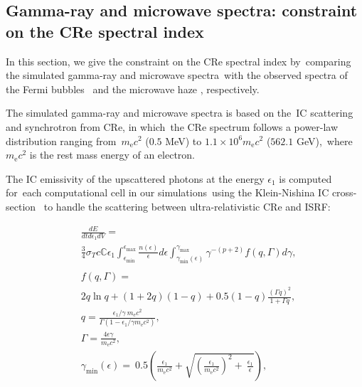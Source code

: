 \documentclass[twocolumn]{aastex631}
\begin{document}
\subsection{Gamma-ray and microwave spectra: constraint on the CRe spectral index}

In this section, we give the constraint on the CRe spectral index by\
comparing the simulated gamma-ray and microwave spectra\
with the observed spectra of the Fermi bubbles \citet{Ackermann2014}\
and the microwave haze \citep{Dobler_2008}, respectively.\

The simulated gamma-ray and microwave spectra is based on the\
IC scattering and synchrotron from CRe, in which\
the CRe spectrum follows a power-law distribution ranging from\
$m_{\text{e}}c^2$ ($0.5$ MeV) to $1.1\times10^{6}m_{\text{e}}c^2$ ($562.1$ GeV),\
where $m_{\text{e}}c^2$ is the rest mass energy of an electron.


The IC emissivity of the upscattered photons at the energy $\epsilon_{1}$ is computed for\
each computational cell in our simulations\
using the Klein-Nishina IC cross-section \citep{Jones1968,BLUMENTHAL1970}\
to handle the scattering between ultra-relativistic CRe and ISRF:

\begin{subequations}
  \begin{align}
  &\frac{dE}{dtd\epsilon_{1}dV} =\nonumber\\
               &\frac{3}{4}\sigma_{T}c\mathbb{C}\epsilon_{1}\int^{\epsilon_{\text{max}}}_{\epsilon_{\text{min}}}
               \frac{n(\epsilon)}{\epsilon}d\epsilon\int^{\gamma_{\text{max}}}_{\gamma_{\text{min}}\left(\epsilon\right)}
               \gamma^{-(p+2)}f(q, \Gamma)d\gamma,\\
  \nonumber\\
  &f(q, \Gamma) =\nonumber\\
               &2q\ln q+(1+2q)(1-q)+0.5(1-q)\frac{\left(\Gamma q\right)^2}{1+\Gamma q},\\
  &q=\frac{\epsilon_{1}/\gamma\
               m_{\text{e}}c^{2}}{\Gamma\left(1-\epsilon_{1}/\gamma m_{\text{e}}c^{2}\right)},\\
  &\Gamma=\frac{4\epsilon \gamma}{m_{\text{e}}c^2},\\
  &\gamma_{\text{min}}(\epsilon)=\
   0.5\left(\frac{\epsilon_{1}}{m_{\text{e}}c^2}+\sqrt{\left(\frac{\epsilon_{1}}{m_{\text{e}}c^2}\right)^2+\
   \frac{\epsilon_{1}}{\epsilon}}\right) \label{gamma-min},
  \end{align}
\label{gammaray-emissivity}
\end{subequations}
\end{document}
